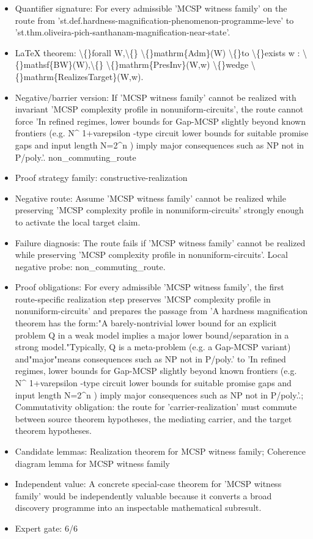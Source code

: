 \documentclass[11pt]{article}
\begin{document}
\begin{itemize}
\item Quantifier signature: For every admissible 'MCSP witness family' on the route from 'st.def.hardness-magnification-phenomenon-programme-leve' to 'st.thm.oliveira-pich-santhanam-magnification-near-state'.
\item LaTeX theorem: \textbackslash\{\}forall W,\textbackslash\{\} \textbackslash\{\}mathrm\{Adm\}(W) \textbackslash\{\}to \textbackslash\{\}exists w : \textbackslash\{\}mathsf\{BW\}(W),\textbackslash\{\} \textbackslash\{\}mathrm\{PresInv\}(W,w) \textbackslash\{\}wedge \textbackslash\{\}mathrm\{RealizesTarget\}(W,w).
\item Negative/barrier version: If 'MCSP witness family' cannot be realized with invariant 'MCSP complexity profile in nonuniform-circuits', the route cannot force 'In refined regimes, lower bounds for Gap-MCSP slightly beyond known frontiers (e.g. N\textasciicircum{} 1+varepsilon -type circuit lower bounds for suitable promise gaps and input length N=2\textasciicircum{}n ) imply major consequences such as NP not in P/poly.'. non\_commuting\_route
\item Proof strategy family: constructive-realization
\item Negative route: Assume 'MCSP witness family' cannot be realized while preserving 'MCSP complexity profile in nonuniform-circuits' strongly enough to activate the local target claim.
\item Failure diagnosis: The route fails if 'MCSP witness family' cannot be realized while preserving 'MCSP complexity profile in nonuniform-circuits'. Local negative probe: non\_commuting\_route.
\item Proof obligations: For every admissible 'MCSP witness family', the first route-specific realization step preserves 'MCSP complexity profile in nonuniform-circuits' and prepares the passage from 'A hardness magnification theorem has the form:"A barely-nontrivial lower bound for an explicit problem Q in a weak model implies a major lower bound/separation in a strong model."Typically, Q is a meta-problem (e.g. a Gap-MCSP variant) and"major"means consequences such as NP not in P/poly.' to 'In refined regimes, lower bounds for Gap-MCSP slightly beyond known frontiers (e.g. N\textasciicircum{} 1+varepsilon -type circuit lower bounds for suitable promise gaps and input length N=2\textasciicircum{}n ) imply major consequences such as NP not in P/poly.'.; Commutativity obligation: the route for 'carrier-realization' must commute between source theorem hypotheses, the mediating carrier, and the target theorem hypotheses.
\item Candidate lemmas: Realization theorem for MCSP witness family; Coherence diagram lemma for MCSP witness family
\item Independent value: A concrete special-case theorem for 'MCSP witness family' would be independently valuable because it converts a broad discovery programme into an inspectable mathematical subresult.
\item Expert gate: 6/6
\end{itemize}
\end{document}
